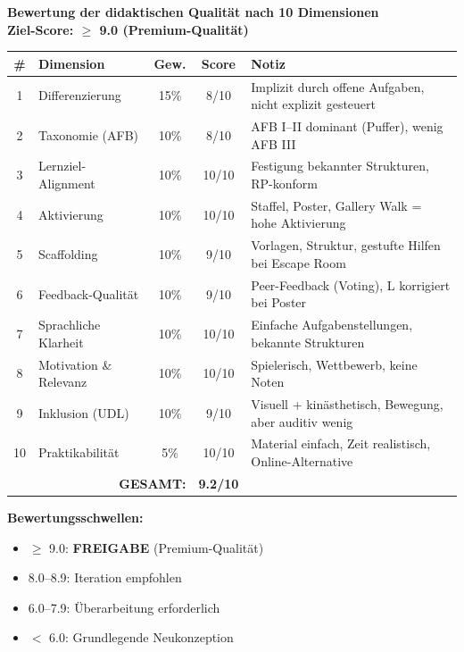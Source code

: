 \documentclass[11pt,a4paper]{article}
\begin{document}
\begin{scorebox}
\textbf{Bewertung der didaktischen Qualität nach 10 Dimensionen}\\
\textbf{Ziel-Score: $\geq$ 9.0 (Premium-Qualität)}

\vspace{1em}
\begin{tabular}{|c|l|c|c|p{4.5cm}|}
\hline
\textbf{\#} & \textbf{Dimension} & \textbf{Gew.} & \textbf{Score} & \textbf{Notiz} \\
\hline
1 & Differenzierung & 15\% & 8/10 & Implizit durch offene Aufgaben, nicht explizit gesteuert \\
\hline
2 & Taxonomie (AFB) & 10\% & 8/10 & AFB I--II dominant (Puffer), wenig AFB III \\
\hline
3 & Lernziel-Alignment & 10\% & 10/10 & Festigung bekannter Strukturen, RP-konform \\
\hline
4 & Aktivierung & 10\% & 10/10 & Staffel, Poster, Gallery Walk = hohe Aktivierung \\
\hline
5 & Scaffolding & 10\% & 9/10 & Vorlagen, Struktur, gestufte Hilfen bei Escape Room \\
\hline
6 & Feedback-Qualität & 10\% & 9/10 & Peer-Feedback (Voting), L korrigiert bei Poster \\
\hline
7 & Sprachliche Klarheit & 10\% & 10/10 & Einfache Aufgabenstellungen, bekannte Strukturen \\
\hline
8 & Motivation \& Relevanz & 10\% & 10/10 & Spielerisch, Wettbewerb, keine Noten \\
\hline
9 & Inklusion (UDL) & 10\% & 9/10 & Visuell + kinästhetisch, Bewegung, aber auditiv wenig \\
\hline
10 & Praktikabilität & 5\% & 10/10 & Material einfach, Zeit realistisch, Online-Alternative \\
\hline
\multicolumn{3}{|r|}{\textbf{GESAMT:}} & \textbf{9.2/10} & \\
\hline
\end{tabular}

\vspace{1em}
\textbf{Bewertungsschwellen:}
\begin{itemize}
    \item[\checkmark] \textcolor{successgreen}{$\geq$ 9.0: \textbf{FREIGABE} (Premium-Qualität)}
    \item[$\Box$] \textcolor{warningorange}{8.0--8.9: Iteration empfohlen}
    \item[$\Box$] 6.0--7.9: Überarbeitung erforderlich
    \item[$\Box$] $<$ 6.0: Grundlegende Neukonzeption
\end{itemize}


\end{scorebox}
\end{document}
